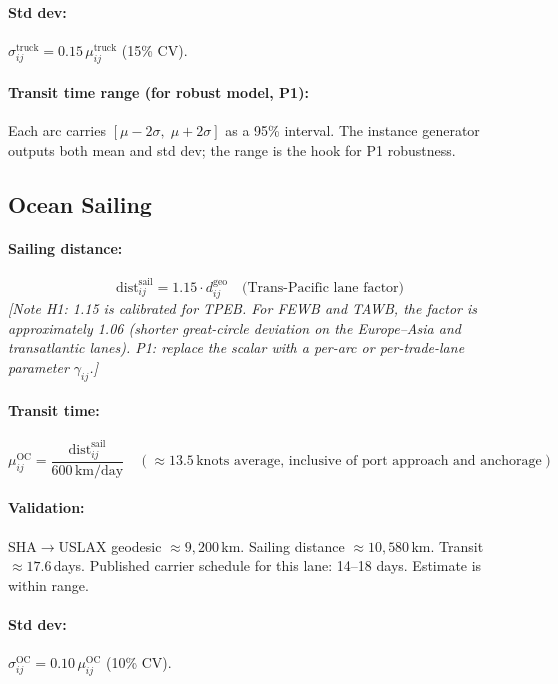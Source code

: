 \documentclass[11pt,a4paper]{article}
\theoremstyle{definition}
\begin{document}
\paragraph{Std dev:} $\sigma_{ij}^{\text{truck}} = 0.15\,\mu_{ij}^{\text{truck}}$ (15\% CV).

\paragraph{Transit time range (for robust model, P1):}
Each arc carries $[\mu - 2\sigma,\; \mu + 2\sigma]$ as a 95\% interval. The instance
generator outputs both mean and std dev; the range is the hook for P1 robustness.

\subsection{Ocean Sailing}

\paragraph{Sailing distance:}
\[
  \text{dist}_{ij}^{\text{sail}} = 1.15 \cdot d_{ij}^{\text{geo}} \quad \text{(Trans-Pacific lane factor)}
\]
\textit{[Note H1: 1.15 is calibrated for TPEB. For FEWB and TAWB, the factor is approximately
1.06 (shorter great-circle deviation on the Europe--Asia and transatlantic lanes). P1: replace
the scalar with a per-arc or per-trade-lane parameter $\gamma_{ij}$.]}

\paragraph{Transit time:}
\[
  \mu_{ij}^{\text{OC}} = \frac{\text{dist}_{ij}^{\text{sail}}}{600\,\text{km/day}}
  \quad (\approx 13.5\,\text{knots average, inclusive of port approach and anchorage})
\]

\paragraph{Validation:} SHA$\to$USLAX geodesic $\approx 9{,}200$\,km. Sailing distance
$\approx 10{,}580$\,km. Transit $\approx 17.6$\,days. Published carrier schedule for this
lane: 14--18 days. Estimate is within range.

\paragraph{Std dev:} $\sigma_{ij}^{\text{OC}} = 0.10\,\mu_{ij}^{\text{OC}}$ (10\% CV).
\end{document}
